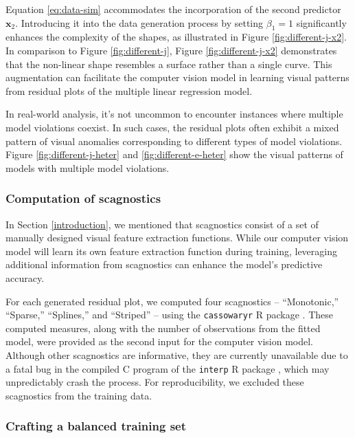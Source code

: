 \documentclass[]{interact}
\theoremstyle{plain}%
\theoremstyle{definition}
\theoremstyle{remark}
\begin{document}
Equation \ref{eq:data-sim} accommodates the incorporation of the second
predictor \(\boldsymbol{x}_2\). Introducing it into the data generation
process by setting \(\beta_1 = 1\) significantly enhances the complexity
of the shapes, as illustrated in Figure \ref{fig:different-j-x2}. In
comparison to Figure \ref{fig:different-j}, Figure
\ref{fig:different-j-x2} demonstrates that the non-linear shape
resembles a surface rather than a single curve. This augmentation can
facilitate the computer vision model in learning visual patterns from
residual plots of the multiple linear regression model.

In real-world analysis, it's not uncommon to encounter instances where
multiple model violations coexist. In such cases, the residual plots
often exhibit a mixed pattern of visual anomalies corresponding to
different types of model violations. Figure \ref{fig:different-j-heter}
and \ref{fig:different-e-heter} show the visual patterns of models with
multiple model violations.

\hypertarget{computation-of-scagnostics}{%
\subsubsection{Computation of
scagnostics}\label{computation-of-scagnostics}}

In Section \ref{introduction}, we mentioned that scagnostics consist of
a set of manually designed visual feature extraction functions. While
our computer vision model will learn its own feature extraction function
during training, leveraging additional information from scagnostics can
enhance the model's predictive accuracy.

For each generated residual plot, we computed four scagnostics --
``Monotonic,'' ``Sparse,'' ``Splines,'' and ``Striped'' -- using the
\texttt{cassowaryr} R package \citep{mason2022cassowaryr}. These
computed measures, along with the number of observations from the fitted
model, were provided as the second input for the computer vision model.
Although other scagnostics are informative, they are currently
unavailable due to a fatal bug in the compiled C program of the
\texttt{interp} R package \citep{Albrecht2023interp}, which may
unpredictably crash the process. For reproducibility, we excluded these
scagnostics from the training data.

\hypertarget{crafting-a-balanced-training-set}{%
\subsubsection{Crafting a balanced training
set}\label{crafting-a-balanced-training-set}}
\end{document}
